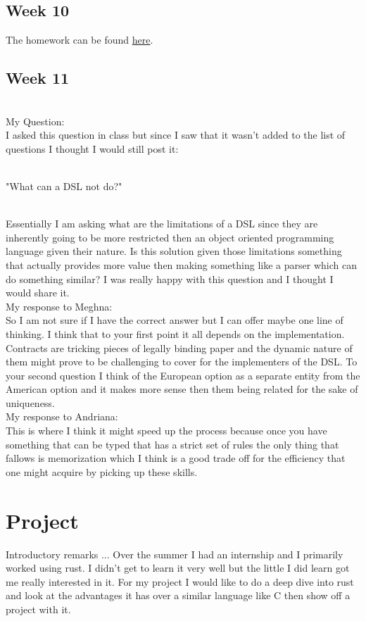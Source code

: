 \documentclass{article}
\theoremstyle{theorem}
\theoremstyle{definition}
\theoremstyle{remark}
\begin{document}
\subsection{Week 10}
The homework can be found \href{https://github.com/jacgoldberg/Programming-Lang/blob/main/homework10.txt}{here}.

\subsection{Week 11}
\\My Question:
\\I asked this question in class but since I saw that it wasn't added to the list of questions I thought I would still post it:

\\"What can a DSL not do?"

\\Essentially I am asking what are the limitations of a DSL since they are inherently going to be more restricted then an object oriented programming language given their nature. Is this solution given those limitations something that actually provides more value then making something like a parser which can do something similar? I was really happy with this question and I thought I would share it.
\\My response to Meghna:
\\So I am not sure if I have the correct answer but I can offer maybe one line of thinking. I think that to your first point it all depends on the implementation. Contracts are tricking pieces of legally binding paper and the dynamic nature of them might prove to be challenging to cover for the implementers of the DSL. To your second question I think of the European option as a separate entity from the American option and it makes more sense then them being related for the sake of uniqueness. 
\\My response to Andriana:
\\This is where I think it might speed up the process because once you have something that can be typed that has a strict set of rules the only thing that fallows is memorization which I think is a good trade off for the efficiency that one might acquire by picking up these skills.


\section{Project}
Introductory remarks ...
Over the summer I had an internship and I primarily worked using rust. I didn't get to learn it very well but the little I did learn got me really interested in it. For my project I would like to do a deep dive into rust and look at the advantages it has over a similar language like C then show off a project with it.
\end{document}
